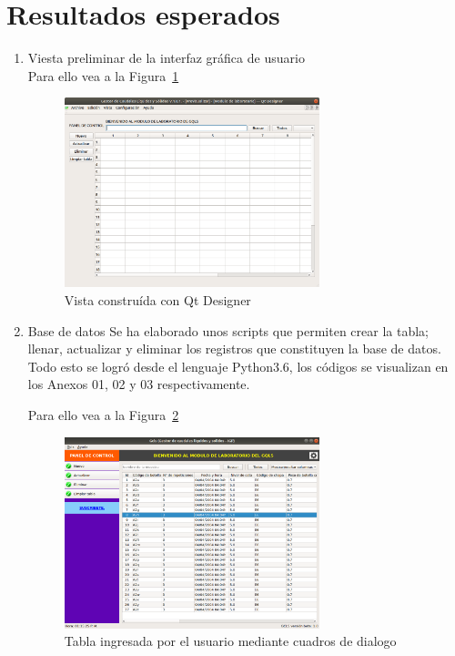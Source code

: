 \documentclass[12pt,a4paper]{report}
\begin{document}
\section{Resultados esperados}

\begin{enumerate}

\item Viesta preliminar de la interfaz gráfica de usuario \\
Para ello vea a la Figura~\ref{fig:Vista_preliminar_de_HyDro-Desktop}

\begin{figure}
  \centering
    \includegraphics[width=0.7\textwidth]{imagenes/GUI_N01_V01}
  \caption{Vista construída con Qt Designer}
  \label{fig:Vista_preliminar_de_HyDro-Desktop}
\end{figure}

\item Base de datos
Se ha elaborado unos scripts que permiten crear la tabla; llenar, actualizar y eliminar los registros que constituyen la base de datos. Todo esto se logró desde el lenguaje Python3.6, los códigos se visualizan en los Anexos 01, 02 y 03 respectivamente.

Para ello vea a la Figura~\ref{fig:Vista_archivo_database_sediments}



\begin{figure}
  \centering
    \includegraphics[width=0.7\textwidth]{imagenes/GUI_N02_V01}
  \caption{Tabla ingresada por el usuario mediante cuadros de dialogo}
  \label{fig:Vista_archivo_database_sediments}
\end{figure}


\end{enumerate}
\end{document}
